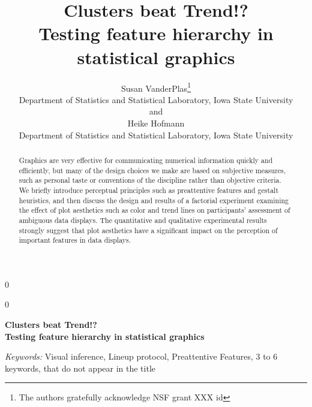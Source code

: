 \documentclass[12pt]{article}\usepackage[]{graphicx}\usepackage[]{color}
\newcommand{\blind}{0}
\begin{document}
%

\def\spacingset#1{\renewcommand{\baselinestretch}%
{#1}\small\normalsize} \spacingset{1}



\blind
{
  \title{\bf Clusters beat Trend!? \\Testing feature hierarchy in statistical graphics}
  \author{Susan VanderPlas\thanks{
    The authors gratefully acknowledge NSF grant XXX id}\hspace{.2cm}\\
    Department of Statistics and Statistical Laboratory, Iowa State University\\
    and \\
    Heike Hofmann\\
    Department of Statistics and Statistical Laboratory, Iowa State University}
  \maketitle
} \fi

\blind
{
  \bigskip
  \bigskip
  \bigskip
  \begin{center}
    {\LARGE\bf Clusters beat Trend!? \\Testing feature hierarchy in statistical graphics}
\end{center}
  \medskip
} \fi

\bigskip
\begin{abstract}
Graphics are very effective for communicating numerical information quickly and efficiently, but many of the design choices we make are based on subjective measures, such as personal taste or conventions of the discipline rather than objective criteria. We briefly introduce perceptual principles such as preattentive features and gestalt heuristics, and then discuss the design and results of a factorial experiment examining the effect of plot aesthetics such as color and trend lines on participants' assessment of ambiguous data displays. The quantitative and qualitative experimental results strongly suggest that plot aesthetics have a significant impact on the perception of important features in data displays. 
\end{abstract}

\noindent%
{\it Keywords:}  Visual inference, Lineup protocol, Preattentive Features, 3 to 6 keywords, that do not appear in the title
\vfill

\newpage
\spacingset{1.45} %
\end{document}
